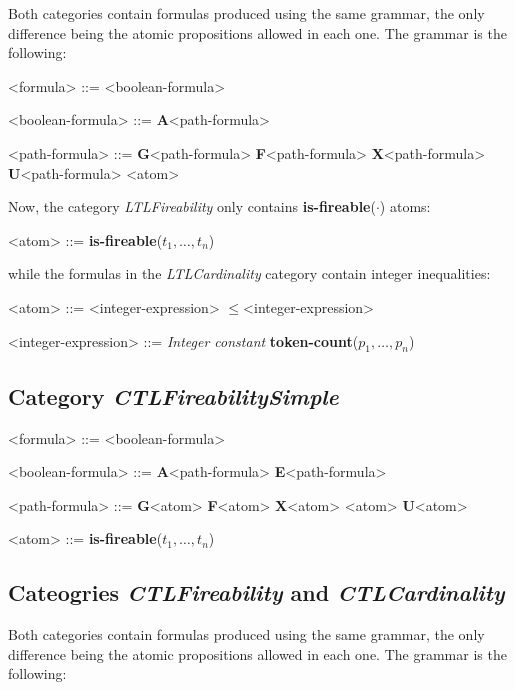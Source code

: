 \documentclass[10pt,english,a4paper]{article}
\newcommand\ctla             {\textbf{A}\xspace}
\newcommand\ctle             {\textbf{E}\xspace}
\newcommand\ltlf             {\textbf{F}\xspace}
\newcommand\ltlg             {\textbf{G}\xspace}
\newcommand\ltlx             {\textbf{X}\xspace}
\newcommand\ltlu             {\textbf{U}\xspace}
\newcommand\atomleq          {\boldmath$\leq$\xspace}
\newcommand\atomisfire[1]    {\textbf{is-fireable}(#1)}
\newcommand\atomtokenscnt[1] {\textbf{token-count}(#1)}
\begin{document}
Both categories contain formulas produced using the same grammar, the only
difference being the atomic propositions allowed in each one.
The grammar is the following:

\begin{grammar}

<formula> ::= <boolean-formula>

<boolean-formula> ::= \ctla <path-formula>

<path-formula> ::=
     \ltlg <path-formula>
\alt \ltlf <path-formula>
\alt \ltlx <path-formula>
 \ltlu <path-formula>
\alt <atom>

\end{grammar}

Now, the category \emph{LTLFireability} only contains \atomisfire{$\cdot$} atoms:

\begin{grammar}
<atom> ::= \atomisfire{$t_1, \ldots, t_n$}
\end{grammar}

while the formulas in the \emph{LTLCardinality} category contain integer
inequalities:

\begin{grammar}
<atom> ::= <integer-expression> \atomleq <integer-expression>

<integer-expression> ::= \textit{Integer constant}
\alt \atomtokenscnt{$p_1, \ldots, p_n$}
\end{grammar}


\subsection{Category \textit{CTLFireabilitySimple}}

\begin{grammar}
<formula> ::= <boolean-formula>

<boolean-formula> ::= \ctla <path-formula>
\alt \ctle <path-formula>

<path-formula> ::=
     \ltlg <atom>
\alt \ltlf <atom>
\alt \ltlx <atom>
\alt <atom> \ltlu <atom>

<atom> ::= \atomisfire{$t_1, \ldots, t_n$}
\end{grammar}

\subsection{Cateogries \emph{CTLFireability} and \emph{CTLCardinality}}

Both categories contain formulas produced using the same grammar, the only
difference being the atomic propositions allowed in each one.
The grammar is the following:
\end{document}
